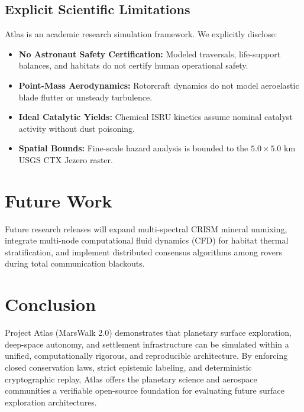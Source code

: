 \documentclass[10pt,journal,compsoc,twocolumn]{article}
\begin{document}
\subsection{Explicit Scientific Limitations}
Atlas is an academic research simulation framework. We explicitly disclose:
\begin{itemize}
    \item \textbf{No Astronaut Safety Certification:} Modeled traversals, life-support balances, and habitats do not certify human operational safety.
    \item \textbf{Point-Mass Aerodynamics:} Rotorcraft dynamics do not model aeroelastic blade flutter or unsteady turbulence.
    \item \textbf{Ideal Catalytic Yields:} Chemical ISRU kinetics assume nominal catalyst activity without dust poisoning.
    \item \textbf{Spatial Bounds:} Fine-scale hazard analysis is bounded to the $5.0 \times 5.0\text{ km}$ USGS CTX Jezero raster.
\end{itemize}

\section{Future Work}
Future research releases will expand multi-spectral CRISM mineral unmixing, integrate multi-node computational fluid dynamics (CFD) for habitat thermal stratification, and implement distributed consensus algorithms among rovers during total communication blackouts.

\section{Conclusion}
Project Atlas (MarsWalk 2.0) demonstrates that planetary surface exploration, deep-space autonomy, and settlement infrastructure can be simulated within a unified, computationally rigorous, and reproducible architecture. By enforcing closed conservation laws, strict epistemic labeling, and deterministic cryptographic replay, Atlas offers the planetary science and aerospace communities a verifiable open-source foundation for evaluating future surface exploration architectures.



\end{document}
